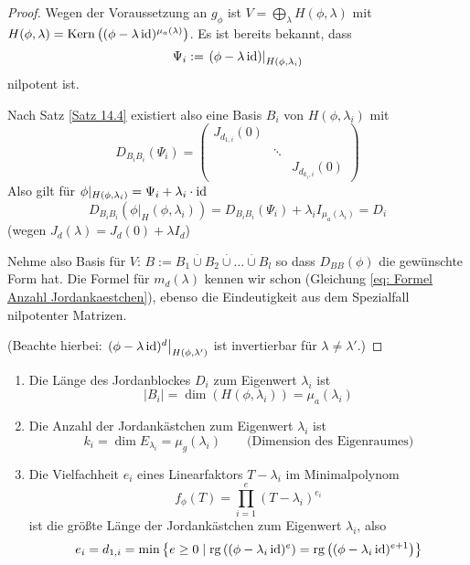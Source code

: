 \documentclass[parskip,a4paper,twoside,DIV15,BCOR12mm]{scrbook}
\begin{document}
\begin{proof}
Wegen der Voraussetzung an \(g_{\phi}\) ist 
\(V=\bigoplus_{\lambda}{H(\phi,\lambda)}\) mit 
\(H(\phi,\lambda)=\operatorname{Kern}\left((\phi-\lambda\operatorname{id})^{\mu_{a}(\lambda)}\right)\). Es
ist bereits bekannt, dass
\[
\Psi_{i}:=\left.(\phi-\lambda\operatorname{id})\right|_{H(\phi,\lambda_{i})}
\]
nilpotent ist.

Nach Satz \ref{Satz 14.4} existiert also eine Basis \(B_{i}\) von 
\(H(\phi,\lambda_{i})\) mit
\[
D_{B_{i}B_{i}}(\Psi_{i})=\begin{pmatrix}
    J_{d_{1,i}}(0)&&\\
    &\ddots&\\
    &&J_{d_{k_{i},i}}(0)
\end{pmatrix}
\]
Also gilt für \(\phi|_{H(\phi,\lambda_{i})}=\Psi_{i}+\lambda_{i}\cdot\operatorname{id}\)
\[
D_{B_{i}B_{i}}\left(\phi|_H(\phi,\lambda_{i})\right)=
    D_{B_{i}B_{i}}(\Psi_{i})+\lambda_{i}I_{\mu_{a}(\lambda_{i})}=D_{i}
\]
(wegen \(J_{d}(\lambda)=J_{d}(0)+\lambda I_{d}\))

Nehme also Basis für \(V\): 
\(B:=B_{1}\overset{\cdot}{\cup}B_{2}\overset{\cdot}{\cup}\ldots
    \overset{\cdot}{\cup}B_{l}\) so dass \(D_{BB}(\phi)\) die gewünschte
Form hat. Die Formel für \(m_{d}(\lambda)\) kennen wir schon (Gleichung
\eqref{eq: Formel Anzahl Jordankaestchen}), ebenso die Eindeutigkeit aus dem
Spezialfall nilpotenter Matrizen.

(Beachte hierbei: \(\left.(\phi-\lambda\operatorname{id})^{d}\right|_{H(\phi,\lambda')}\) ist
invertierbar für \(\lambda\neq\lambda'\).)
\end{proof}
\begin{corollary}
\label{Korollar 14.1}
\begin{enumerate}
\item Die Länge des Jordanblockes \(D_{i}\) zum Eigenwert \(\lambda_{i}\) ist
\[
\lvert B_{i}\rvert=\dim\left(H(\phi,\lambda_{i})\right)=\mu_{a}(\lambda_{i})
\]
\item Die Anzahl der Jordankästchen zum Eigenwert \(\lambda_{i}\) ist
\[
k_{i}=\dim E_{\lambda_{i}}=\mu_{g}(\lambda_{i})
    \qquad\text{(Dimension des Eigenraumes)}
\]
\item Die Vielfachheit \(e_{i}\) eines Linearfaktors \(T-\lambda_{i}\) im
Minimalpolynom
\[
f_{\phi}(T)=\prod_{i=1}^{e}{(T-\lambda_{i})^{e_{i}}}
\]
ist die größte Länge der Jordankästchen zum Eigenwert \(\lambda_{i}\),
also
\[
e_{i}=d_{1,i}=\min\left\{
    e\geq0\mid\operatorname{rg}\left((\phi-\lambda_{i}\operatorname{id})^{e}\right)=
	\operatorname{rg}\left((\phi-\lambda_{i}\operatorname{id})^{e+1}\right)\right\}
\]
\end{enumerate}
\end{corollary}
\end{document}
